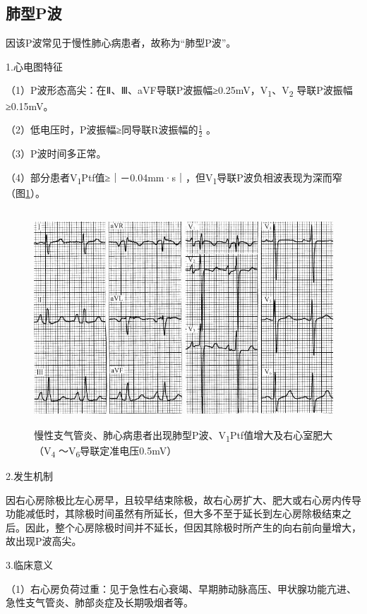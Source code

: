 \protect\hypertarget{text00007.htmlux5cux23subid5}{}{}

\subsection{肺型P波}

因该P波常见于慢性肺心病患者，故称为“肺型P波”。

1.心电图特征

（1）P波形态高尖：在Ⅱ、Ⅲ、aVF导联P波振幅≥0.25mV，V\textsubscript{1}、V\textsubscript{2} 导联P波振幅≥0.15mV。

（2）低电压时，P波振幅≥同导联R波振幅的$\frac{1}{2}$
。

（3）P波时间多正常。

（4）部分患者V\textsubscript{1}Ptf值≥｜－0.04mm·s｜，但V\textsubscript{1}导联P波负相波表现为深而窄（图\ref{fig1-3}）。

\begin{figure}[!htbp]
 \centering
 \includegraphics[width=4.94792in,height=3.17708in]{./images/Image00008.jpg}
 \captionsetup{justification=centering}
 \caption{慢性支气管炎、肺心病患者出现肺型P波、V\textsubscript{1}Ptf值增大及右心室肥大（V\textsubscript{4} ～V\textsubscript{6}导联定准电压0.5mV）}
 \label{fig1-3}
  \end{figure} 


2.发生机制

因右心房除极比左心房早，且较早结束除极，故右心房扩大、肥大或右心房内传导功能减低时，其除极时间虽然有所延长，但大多不至于延长到左心房除极结束之后。因此，整个心房除极时间并不延长，但因其除极时所产生的向右前向量增大，故出现P波高尖。

3.临床意义

（1）右心房负荷过重：见于急性右心衰竭、早期肺动脉高压、甲状腺功能亢进、急性支气管炎、肺部炎症及长期吸烟者等。

